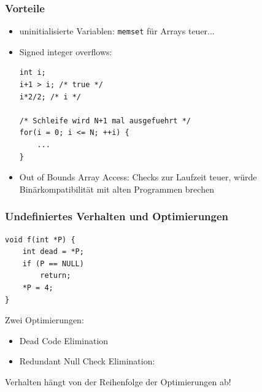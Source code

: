 \documentclass[12pt,compress]{beamer}
\begin{document}

\begin{frame}[fragile]
\frametitle{Vorteile}

\begin{itemize}
\item uninitialisierte Variablen: \texttt{memset} für Arrays teuer...
\item Signed integer overflows:
\begin{lstlisting}
int i;
i+1 > i; /* true */ 
i*2/2; /* i */

/* Schleife wird N+1 mal ausgefuehrt */
for(i = 0; i <= N; ++i) {
	...
}
\end{lstlisting}
\item Out of Bounds Array Access: Checks zur Laufzeit teuer, würde Binärkompatibilität mit alten Programmen brechen
\end{itemize}
\end{frame}


\begin{frame}[fragile]
\frametitle{Undefiniertes Verhalten und Optimierungen}

\begin{lstlisting}
void f(int *P) {
    int dead = *P;
    if (P == NULL)
        return;
    *P = 4;
}
\end{lstlisting}

\vfill
Zwei Optimierungen:
\begin{itemize}
\item Dead Code Elimination
\item Redundant Null Check Elimination:
\end{itemize}

\vfill

Verhalten hängt von der Reihenfolge der Optimierungen ab!
\end{frame}
\end{document}

